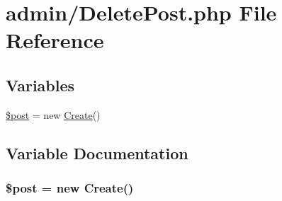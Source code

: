 \hypertarget{_delete_post_8php}{}\section{admin/\+Delete\+Post.php File Reference}
\label{_delete_post_8php}
\subsection*{Variables}
\begin{DoxyCompactItemize}
\item 
\hyperlink{_delete_post_8php_a53d6c7669d97392c407c4f959a5263db}{\$post} = new \hyperlink{class_create}{Create}()
\end{DoxyCompactItemize}


\subsection{Variable Documentation}
\subsubsection[{\texorpdfstring{\$post}{$post}}]{\setlength{\rightskip}{0pt plus 5cm}\$post = new {\bf Create}()}\hypertarget{_delete_post_8php_a53d6c7669d97392c407c4f959a5263db}{}\label{_delete_post_8php_a53d6c7669d97392c407c4f959a5263db}
